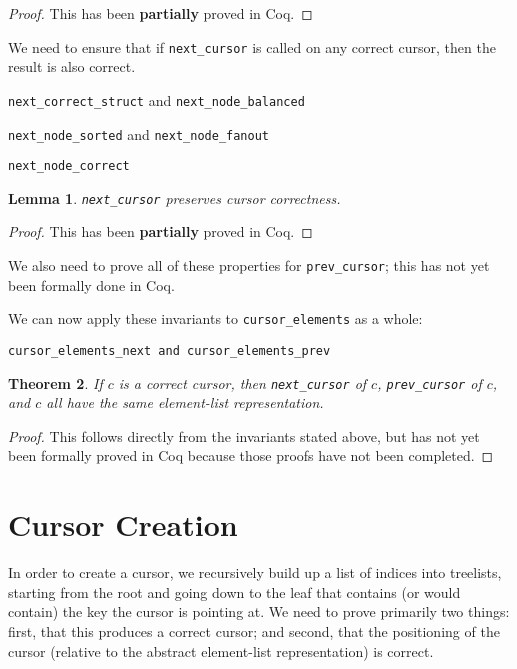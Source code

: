 \documentclass[12pt]{article}
\newtheorem{theorem}{Theorem}
\newtheorem{lemma}[theorem]{Lemma}
\begin{document}
\begin{proof}
This has been \textbf{partially} proved in Coq.
\end{proof}

We need to ensure that if \texttt{next\_cursor} is called on any correct cursor, then the result is also correct.

\bigskip
\texttt{next\_correct\_struct} and \texttt{next\_node\_balanced}

\texttt{next\_node\_sorted} and \texttt{next\_node\_fanout}

\texttt{next\_node\_correct}

\begin{lemma}
\texttt{next\_cursor} preserves cursor correctness.
\end{lemma}

\begin{proof}
This has been \textbf{partially} proved in Coq.
\end{proof}

We also need to prove all of these properties for \texttt{prev\_cursor}; this has not yet been formally done in Coq.

We can now apply these invariants to \texttt{cursor\_elements} as a whole:

\bigskip
\texttt{cursor\_elements\_next and cursor\_elements\_prev}

\begin{theorem}
If $c$ is a correct cursor, then \texttt{next\_cursor} of $c$, \texttt{prev\_cursor} of $c$, and $c$ all have the same element-list representation.
\end{theorem}

\begin{proof}
This follows directly from the invariants stated above, but has not yet been formally proved in Coq because those proofs have not been completed.
\end{proof}

\section{Cursor Creation}

In order to create a cursor, we recursively build up a list of indices into treelists, starting from the root and going down to the leaf that contains (or would contain) the key the cursor is pointing at. We need to prove primarily two things: first, that this produces a correct cursor; and second, that the positioning of the cursor (relative to the abstract element-list representation) is correct.
\end{document}
